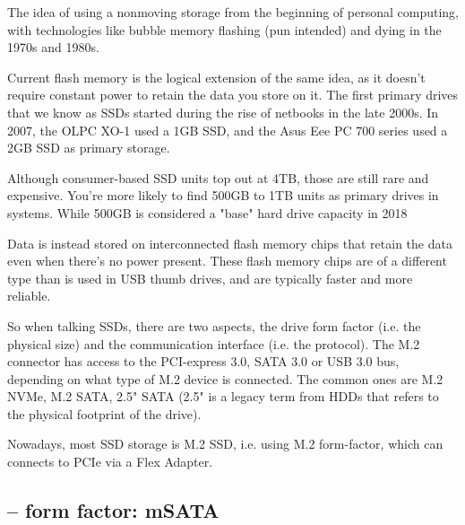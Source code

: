 \begin{mdframed}

The idea of using a nonmoving storage from the beginning of personal computing,
with technologies like bubble memory flashing (pun intended) and dying in the
1970s and 1980s.

Current flash memory is the logical extension of the same idea, as it doesn't
require constant power to retain the data you store on it. The first primary
drives that we know as SSDs started during the rise of netbooks in the late
2000s. In 2007, the OLPC XO-1 used a 1GB SSD, and the Asus Eee PC 700 series
used a 2GB SSD as primary storage.

Although consumer-based SSD units top out at 4TB, those are still rare and
expensive. You're more likely to find 500GB to 1TB units as primary drives in
systems. While 500GB is considered a "base" hard drive capacity in 2018 

\end{mdframed}

Data is instead stored on interconnected flash memory chips that retain the data
even when there's no power present. These flash memory chips are of a different
type than is used in USB thumb drives, and are typically faster and more
reliable.

So when talking SSDs, there are two aspects, the drive form factor (i.e. the
physical size) and the communication interface (i.e. the protocol). The M.2
connector has access to the PCI-express 3.0, SATA 3.0 or USB 3.0 bus, depending
on what type of M.2 device is connected. The common ones are M.2 NVMe, M.2 SATA,
2.5" SATA (2.5" is a legacy term from HDDs that refers to the physical footprint
of the drive).

Nowadays, most SSD storage is M.2 SSD, i.e. using M.2 form-factor, which
can connects to PCIe via a Flex Adapter.

%  
%    



\subsection{-- form factor: mSATA}

